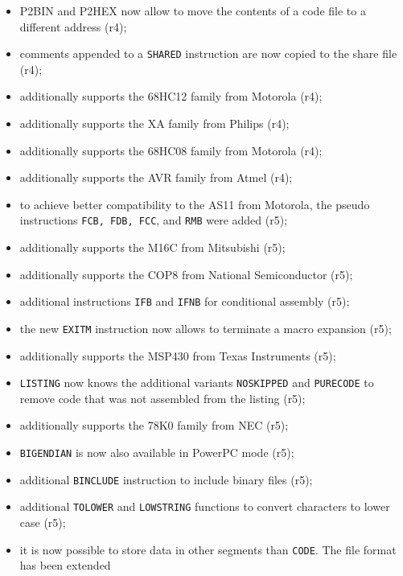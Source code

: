 \documentclass[12pt,twoside]{report}
\newcommand{\tty}[1]{{\tt #1}}
\begin{document}
\begin{itemize}
{\begin{itemize}
{            as entry point for the program (r3);}
      \item{P2BIN and P2HEX now allow to move the contents of a
            code file to a different address (r4);}
      \item{comments appended to a \tty{SHARED} instruction are now
            copied to the share file (r4);}
      \item{additionally supports the 68HC12 family from Motorola
            (r4);}
      \item{additionally supports the XA family from Philips
            (r4);}
      \item{additionally supports the 68HC08 family from Motorola
            (r4);}
      \item{additionally supports the AVR family from Atmel (r4);}
      \item{to achieve better compatibility to the AS11 from
            Motorola, the pseudo instructions \tty{FCB, FDB, FCC}, and
            \tty{RMB} were added (r5);}
      \item{additionally supports the M16C from Mitsubishi (r5);}
      \item{additionally supports the COP8 from National
            Semiconductor (r5);}
      \item{additional instructions \tty{IFB} and \tty{IFNB} for conditional
            assembly (r5);}
      \item{the new \tty{EXITM} instruction now allows to terminate a
            macro expansion (r5);}
      \item{additionally supports the MSP430 from Texas
            Instruments (r5);}
      \item{\tty{LISTING} now knows the additional variants
            \tty{NOSKIPPED} and \tty{PURECODE} to remove code that
            was not assembled from the listing (r5);}
      \item{additionally supports the 78K0 family from NEC (r5);}
      \item{\tty{BIGENDIAN} is now also available in PowerPC mode
            (r5);}
      \item{additional \tty{BINCLUDE} instruction to include binary
            files (r5);}
      \item{additional \tty{TOLOWER} and \tty{LOWSTRING} functions to convert
            characters to lower case (r5);}
      \item{it is now possible to store data in other segments
            than \tty{CODE}.  The file format has been extended
}
\end{itemize}}
\end{itemize}
\end{document}
